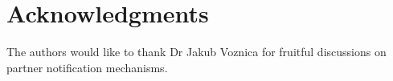 \documentclass[10pt,letterpaper]{article}
\begin{document}
\section*{Acknowledgments}
The authors would like to thank Dr Jakub Voznica for fruitful discussions on partner notification mechanisms.

\nolinenumbers



%
%
% 
%
%
%
%
\end{document}
